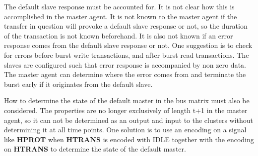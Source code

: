 The default slave response must be accounted for. It is not clear how this is accomplished in the master agent. It is not known to the master agent if the transfer in question will provoke a default slave response or not, so the duration of the transaction is not known beforehand. It is also not known if an error response comes from the default slave response or not. One suggestion is to check for errors before burst write transactions, and after burst read transactions. The slaves are configured such that error response is accompanied by non zero data. The master agent can determine where the error comes from and terminate the burst early if it originates from the default slave. \par
How to determine the state of the default master in the bus matrix must also be considered. The properties are no longer exclusively of length t+1 in the master agent, so it can not be determined as an output and input to the clusters without determining it at all time points. One solution is to use an encoding on a signal like \textbf{HPROT} when \textbf{HTRANS} is encoded with IDLE together with the encoding on \textbf{HTRANS} to determine the state of the default master.   



